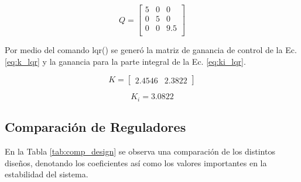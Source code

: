 \documentclass[conference,onecolumn,12pt]{IEEEtran}
\numberwithin{equation}{subsection}
\begin{document}
\begin{equation}
   Q = \begin{bmatrix}
       5 & 0 & 0 \\
       0 & 5 & 0 \\
       0 & 0 & 9.5 \\
   \end{bmatrix}
    \label{eq:q_lqr}
\end{equation}

Por medio del comando lqr() se generó la matriz de ganancia de control de la Ec. \ref{eq:k_lqr} y la ganancia para la parte integral de la Ec. \ref{eq:ki_lqr}.

\begin{equation}
   K = \begin{bmatrix}
       2.4546 & 2.3822
   \end{bmatrix}
    \label{eq:k_lqr}
\end{equation}

\begin{equation}
    K_i = 3.0822
    \label{eq:ki_lqr}
\end{equation}



\subsection{Comparación de Reguladores}

En la Tabla \ref{tab:comp_design} se observa una comparación de los distintos diseños, denotando los coeficientes así como los valores importantes en la estabilidad del sistema.
\end{document}
